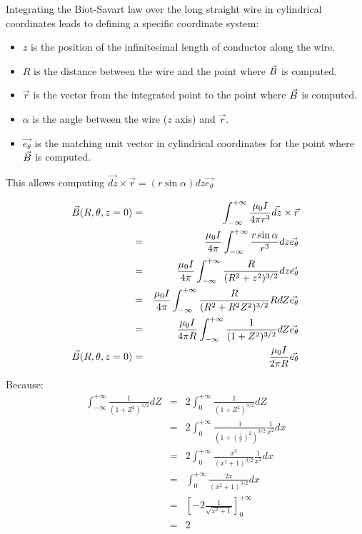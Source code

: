\documentclass[a4paper,10pt]{article}
\newcommand{\vB}{\ensuremath\vec{B}} %
\begin{document}
Integrating the Biot-Savart law over the long straight wire in cylindrical coordinates leads to defining a specific coordinate system:
\begin{itemize}
  \item $z$ is the position of the infinitesimal length of conductor along the wire.
  \item $R$ is the distance between the wire and the point where $\vB$ is computed.
  \item $\vec{r}$ is the vector from the integrated point to the point where $\vB$ is computed.
  \item $\alpha$ is the angle between the wire ($z$ axis) and $\vec{r}$.
  \item $\vec{e_\theta}$ is the matching unit vector in cylindrical coordinates for the point where $\vB$ is computed.
\end{itemize}

This allows computing $\vec{dz} \times \vec{r} = (r \sin\alpha)dz \vec{e_\theta}$

\begin{eqnarray}
  \vB(R,\theta,z=0) &=& \int_{-\infty}^{+\infty} \frac{\mu_0 I}{4 \pi r^3} \vec{dz} \times \vec{r} \\
    &=& \frac{\mu_0 I}{4 \pi} \int_{-\infty}^{+\infty} \frac{r \sin\alpha}{r^3} dz \vec{e_\theta} \\
    &=& \frac{\mu_0 I}{4 \pi} \int_{-\infty}^{+\infty} \frac{R}{(R^2 + z^2)^{3/2}} dz \vec{e_\theta} \\
    &=& \frac{\mu_0 I}{4 \pi} \int_{-\infty}^{+\infty} \frac{R}{(R^2 + R^2 Z^2)^{3/2}} RdZ \vec{e_\theta} \\
    &=& \frac{\mu_0 I}{4 \pi R} \int_{-\infty}^{+\infty} \frac{1}{(1 + Z^2)^{3/2}} dZ \vec{e_\theta} \\
  \vB(R,\theta,z=0) &=& \frac{\mu_0 I}{2 \pi R} \vec{e_\theta}
\end{eqnarray}

Because:
\begin{eqnarray}
  \int_{-\infty}^{+\infty} \frac{1}{(1 + Z^2)^{3/2}} dZ &=& 2\int_{0}^{+\infty} \frac{1}{(1 + Z^2)^{3/2}} dZ \\
    &=& 2\int_{0}^{+\infty} \frac{1}{\left(1 + \left(\frac{1}{x}\right)^2\right)^{3/2}} \frac{1}{x^2} dx \\
    &=& 2\int_{0}^{+\infty} \frac{x^3}{\left(x^2 + 1\right)^{3/2}} \frac{1}{x^2} dx \\
    &=& \int_{0}^{+\infty} \frac{2x}{\left(x^2 + 1\right)^{3/2}} dx \\
    &=& \left[-2 \frac{1}{\sqrt{x^2 + 1}}\right]_{0}^{+\infty} \\
   &=& 2
\end{eqnarray}
\end{document}
